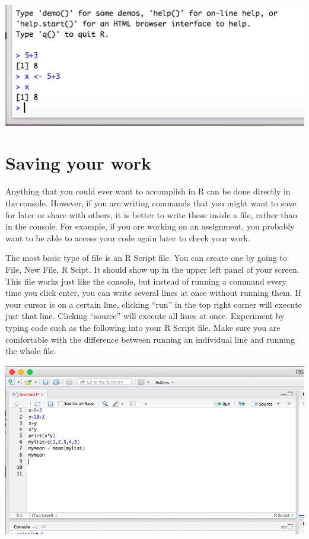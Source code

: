 \documentclass[
]{article}
\begin{document}
\includegraphics[width=7.29167in,height=\textheight,keepaspectratio]{more/rascalc.png}

\section{Saving your work}\label{saving-your-work}

Anything that you could ever want to accomplish in R can be done
directly in the console. However, if you are writing commands that you
might want to save for later or share with others, it is better to write
these inside a file, rather than in the console. For example, if you are
working on an assignment, you probably want to be able to access your
code again later to check your work.

The most basic type of file is an R Script file. You can create one by
going to File, New File, R Scipt. It should show up in the upper left
panel of your screen. This file works just like the console, but instead
of running a command every time you click enter, you can write several
lines at once without running them. If your cursor is on a certain line,
clicking ``run'' in the top right corner will execute just that line.
Clicking ``source'' will execute all lines at once. Experiment by typing
code such as the following into your R Script file. Make sure you are
comfortable with the difference between running an individual line and
running the whole file.

\includegraphics[width=7.29167in,height=\textheight,keepaspectratio]{more/RScriptpractice.png}
\end{document}
